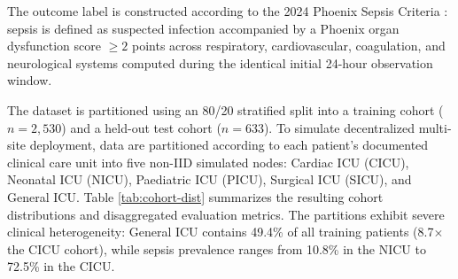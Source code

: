 \documentclass[sigconf,review,anonymous]{acmart}
\begin{document}
The outcome label is constructed according to the 2024 Phoenix Sepsis Criteria \cite{schlapbach2024phoenix,sanchezpinto2024phoenix}: sepsis is defined as suspected infection accompanied by a Phoenix organ dysfunction score $\ge 2$ points across respiratory, cardiovascular, coagulation, and neurological systems computed during the identical initial 24-hour observation window.

The dataset is partitioned using an 80/20 stratified split into a training cohort ($n = 2{,}530$) and a held-out test cohort ($n = 633$). To simulate decentralized multi-site deployment, data are partitioned according to each patient's documented clinical care unit into five non-IID simulated nodes: Cardiac ICU (CICU), Neonatal ICU (NICU), Paediatric ICU (PICU), Surgical ICU (SICU), and General ICU. Table \ref{tab:cohort-dist} summarizes the resulting cohort distributions and disaggregated evaluation metrics. The partitions exhibit severe clinical heterogeneity: General ICU contains 49.4\% of all training patients (8.7$\times$ the CICU cohort), while sepsis prevalence ranges from 10.8\% in the NICU to 72.5\% in the CICU.
\end{document}

